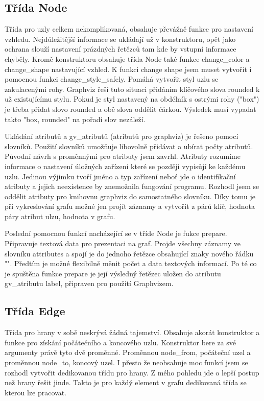 \documentclass[color,table,oneside,nolot,nolof]{fithesis}
\begin{document}
\subsection{Třída Node}
	Třída pro uzly celkem nekomplikovaná, obsahuje převážně funkce pro nastavení vzhledu. Nejdůležitější informace se ukládají už v konstruktoru, opět jako ochrana slouží nastavení
	prázdných řetězců tam kde by vstupní informace chyběly. Kromě konstruktoru obsahuje třída Node také funkce change_color a change_shape nastavující vzhled. K funkci change shape 
	jsem muset vytvořit i pomocnou funkci change_style_safely. Pomáhá vytvořit styl uzlu se zakulacenými rohy. Graphviz řeší tuto situaci přidáním klíčového slova rounded k už 
	existujícímu stylu. Pokud je styl nastavený na obdélník s ostrými rohy ("box") je třeba přidat slovo rounded a obě slova oddělit čárkou. Výsledek musí vypadat takto "box, rounded"
	na pořadí slov nezáleží.

	Ukládání atributů a gv_atributů (atributů pro graphviz) je řešeno pomocí slovníků. Použití slovníků umožňuje libovolně přidávat a ubírat počty atributů. Původní návrh s proměnnými
	pro atributy jsem zavrhl. Atributy rozumíme informace o nastavení úložných zařízení které se později vypisůjí ke každému uzlu. Jedinou výjimku tvoří jméno a typ zařízení neboť jde
	o identifikační atributy a jejich neexistence by znemožnila fungování programu. Rozhodl jsem se oddělit atributy pro knihovnu graphviz do samostatného slovníku. Díky tomu je při
	vykreslování grafu možné jen projít záznamy a vytvořit z párů klíč, hodnota páry atribut ulzu, hodnota v grafu. 

	Poslední pomocnou funkcí nacházející se v tříde Node je fukce prepare. Připravuje textová data pro prezentaci na graf. Projde všechny záznamy ve slovníku attributes a spojí je do 
	jednoho řetězce obsahující znaky nového řádku "\n". Předtím je možné flexibilně měnit počet a data textových informací. Po té co je spuštěna funkce prepare je její výsledný řetězec
	uložen do atributu gv_atributu label, připraven pro použití Graphvizem.

\subsection{Třída Edge}
	Třída pro hrany v sobě neskrývá žádná tajemství. Obsahuje akorát konstruktor a funkce pro získání počátečního a koncového uzlu. Konstruktor bere za své argumenty právě tyto dvě 
	proměnné. Proměnnou node_from, počáteční uzel a proměnnou node_to, koncový uzel. I přesto že neobsahuje moc funkcí jsem se rozhodl vytvořit dedikovanou třídu pro hrany. Z mého 
	pohledu jde o lepší postup než hrany řešit jinde. Takto je pro každý element v grafu dedikovaná třída se kterou lze pracovat.
\end{document}
